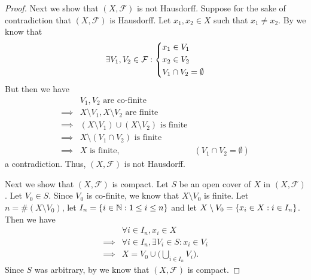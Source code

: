 \begin{proof}
  Next we show that \((X, \mathcal{F})\) is not Hausdorff.
  Suppose for the sake of contradiction that \((X, \mathcal{F})\) is Hausdorff.
  Let \(x_1, x_2 \in X\) such that \(x_1 \neq x_2\).
  By  we know that
  \[
    \exists V_1, V_2 \in \mathcal{F} : \begin{dcases}
      x_1 \in V_1 \\
      x_2 \in V_2 \\
      V_1 \cap V_2 = \emptyset
    \end{dcases}
  \]
  But then we have
  \begin{align*}
             & V_1, V_2 \text{ are co-finite}                                                          \\
    \implies & X \setminus V_1, X \setminus V_2 \text{ are finite}                                     \\
    \implies & (X \setminus V_1) \cup (X \setminus V_2) \text{ is finite}                              \\
    \implies & X \setminus (V_1 \cap V_2) \text{ is finite}                                            \\
    \implies & X \text{ is finite},                                       & (V_1 \cap V_2 = \emptyset)
  \end{align*}
  a contradiction.
  Thus, \((X, \mathcal{F})\) is not Hausdorff.

  Next we show that \((X, \mathcal{F})\) is compact.
  Let \(S\) be an open cover of \(X\) in \((X, \mathcal{F})\).
  Let \(V_0 \in S\).
  Since \(V_0\) is co-finite, we know that \(X \setminus V_0\) is finite.
  Let \(n = \#(X \setminus V_0)\), let \(I_n = \left\lbrace i \in \mathbb{N} : 1 \leq i \leq n\right\rbrace\) and let \(X \setminus V_0 = \left\lbrace x_i \in X : i \in I_n\right\rbrace\).
  Then we have
  \begin{align*}
             & \forall i \in I_n, x_i \in X                       \\
    \implies & \forall i \in I_n, \exists V_i \in S : x_i \in V_i \\
    \implies & X = V_0 \cup \bigg(\bigcup_{i \in I_n} V_i\bigg).
  \end{align*}
  Since \(S\) was arbitrary, by  we know that \((X, \mathcal{F})\) is compact.


\end{proof}
